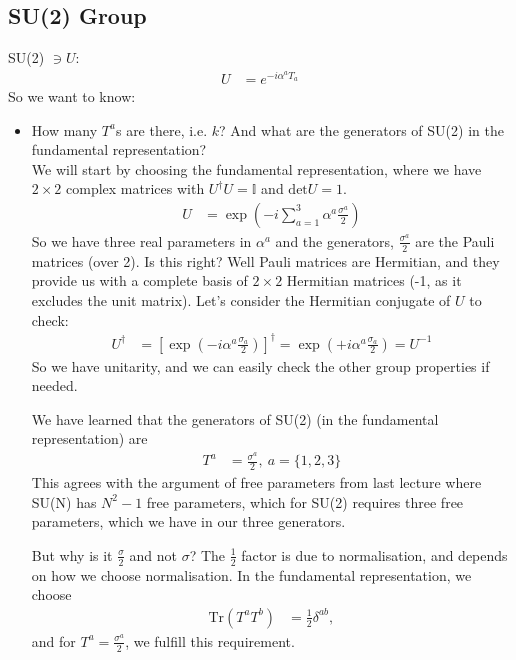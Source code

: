\documentclass[relqm.tex]{subfiles}
\begin{document}
\subsection{SU(2) Group}
SU(2) $\ni U$:
\begin{align}
    U &= e^{-i\alpha^a T_a}
\end{align}
So we want to know:
\begin{itemize}
    \item How many $T^a$s are there, i.e. $k$? And what are the generators of SU(2) in the fundamental representation? \\
        We will start by choosing the fundamental representation, where we have $2\times2$ complex matrices with $U^\dagger U = \mathbb{I}$ and $\text{det}U = 1$.
        \begin{align}
            U &= \exp\left(-i\sum_{a=1}^3 \alpha^a\frac{\sigma^a}{2}\right)
        \end{align}
        So we have three real parameters in $\alpha^a$ and the generators, $\frac{\sigma^a}{2}$ are the Pauli matrices (over 2). 
        Is this right?
        Well Pauli matrices are Hermitian, and they provide us with a complete basis of $2\times2$ Hermitian matrices (-1, as it excludes the unit matrix).
        Let's consider the Hermitian conjugate of $U$ to check:
        \begin{align}
            U^\dagger &= \left[\exp\left(-i\alpha^a\frac{\sigma_a}{2}\right)\right]^\dagger = \exp\left(+i\alpha^a\frac{\sigma_a}{2}\right) = U^{-1}
        \end{align}
        So we have unitarity, and we can easily check the other group properties if needed.

        We have learned that the generators of SU(2) (in the fundamental representation) are 
        \begin{align}
            T^a &= \frac{\sigma^a}{2},~ a = \{1,2,3\}
        \end{align}
        This agrees with the argument of free parameters from last lecture where SU(N) has $N^2-1$ free parameters, which for SU(2) requires three free parameters, which we have in our three generators. 
        
        But why is it $\frac{\sigma}{2}$ and not $\sigma$? The $\frac12$ factor is due to normalisation, and depends on how we choose normalisation. 
        In the fundamental representation, we choose
        \begin{align}
            \text{Tr}(T^aT^b) &= \frac12 \delta^{ab},
        \end{align}
        and for $T^a = \frac{\sigma^a}{2}$, we fulfill this requirement.


\end{itemize}
\end{document}
